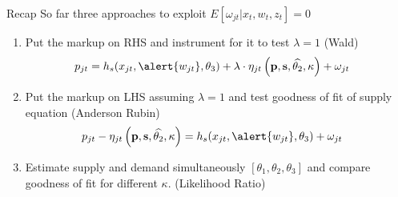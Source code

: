\documentclass[xcolor=pdftex,dvipsnames,table,mathserif,aspectratio=169]{beamer}
\begin{document}
\begin{frame}{Recap}
\small
So far three approaches to exploit $ E[\omega_{jt} | x_{t},w_{t},z_{t}]=0$
\begin{enumerate}
\item Put the markup on RHS and instrument for it to test $\lambda=1$ (Wald)
\begin{align*}
 p_{jt} &= h_s(x_{jt}, \alert{w_{jt}},\theta_3) + \lambda \cdot \eta_{jt}\left(\mathbf{p},\mathbf{s},\widehat{\theta_2},\kappa \right)+  \omega_{jt}
\end{align*}
\item Put the markup on LHS assuming $\lambda=1$ and test goodness of fit of supply equation (Anderson Rubin)
\begin{align*}
 p_{jt} -\eta_{jt}\left(\mathbf{p},\mathbf{s},\widehat{\theta_2},\kappa \right)&= h_s(x_{jt}, \alert{w_{jt}},\theta_3) +  \omega_{jt}
\end{align*}
\item Estimate supply and demand simultaneously $[\theta_1,\theta_2,\theta_3]$ and compare goodness of fit for different $\kappa$. (Likelihood Ratio)
\end{enumerate}

\end{frame}

\end{document}
